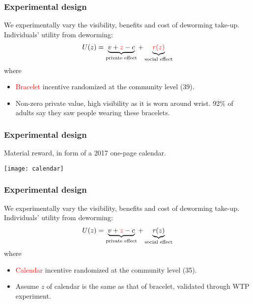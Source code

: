 \documentclass{beamer}
\theoremstyle{plain}
\begin{document}
\begin{frame}[label=slide11]
\frametitle{\large{Experimental design}}
We experimentally vary the visibility, benefits and cost of deworming take-up. Individuals' utility from deworming:
\bigskip
\begin{align}
U(z) =  \underbrace{v + \textcolor{red}{z} - c}_{\text{private effect}} + \underbrace{\textcolor{red}{r(z)}}_{\text{social effect}} \nonumber   
\end{align}
where 
\begin{itemize}
\item \textcolor{red}{Bracelet} incentive randomized at the community level (39). 
\item Non-zero private value, high visibility as it is worn around wrist. 92$\%$ of adults say they saw people wearing these bracelets.
\end{itemize}
\end{frame}

\begin{frame}[label=slide12]
\frametitle{\large{Experimental design}}
Material reward, in form of a 2017 one-page calendar.
\begin{center}
\texttt{[image: calendar]}
\end{center}
\end{frame}


\begin{frame}[label=slide13]
\frametitle{\large{Experimental design}}
We experimentally vary the visibility, benefits and cost of deworming take-up. Individuals' utility from deworming:
\bigskip
\begin{align}
U(z) = \underbrace{v + \textcolor{red}{z} - c}_{\text{private effect}} + \underbrace{r(z)}_{\text{social effect}}  \nonumber   
\end{align} 
where 
\begin{itemize}
\item \textcolor{red}{Calendar} incentive randomized at the community level (35).  
\item Assume $z$ of calendar is the same as that of bracelet, validated through WTP experiment. 
\hyperlink{slide101}{}
\end{itemize}
\end{frame}
\end{document}
